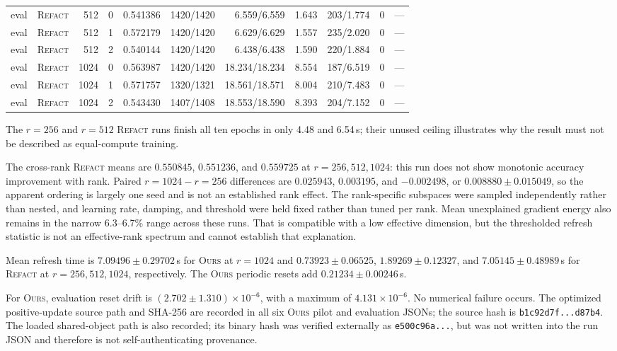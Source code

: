 \documentclass[11pt]{article}
\newcommand{\ours}{\textsc{Ours}}
\newcommand{\refact}{\textsc{Refact}}
\begin{document}
\begin{landscape}
{\begin{longtable}{@{}llrrrrrrrrr@{}}
\midrule
eval & \refact{} & 512 & 0 & 0.541386 & 1420/1420 & 6.559/6.559 &
  1.643 & 203/1.774 & 0 & --- \\
eval & \refact{} & 512 & 1 & 0.572179 & 1420/1420 & 6.629/6.629 &
  1.557 & 235/2.020 & 0 & --- \\
eval & \refact{} & 512 & 2 & 0.540144 & 1420/1420 & 6.438/6.438 &
  1.590 & 220/1.884 & 0 & --- \\
\midrule
eval & \refact{} & 1024 & 0 & 0.563987 & 1420/1420 & 18.234/18.234 &
  8.554 & 187/6.519 & 0 & --- \\
eval & \refact{} & 1024 & 1 & 0.571757 & 1320/1321 & 18.561/18.571 &
  8.004 & 210/7.483 & 0 & --- \\
eval & \refact{} & 1024 & 2 & 0.543430 & 1407/1408 & 18.553/18.590 &
  8.393 & 204/7.152 & 0 & --- \\
\bottomrule
\end{longtable}
}
\end{landscape}

The \(r=256\) and \(r=512\) \refact{} runs finish all ten epochs in only 4.48
and 6.54\,s; their unused ceiling illustrates why the result must not be
described as equal-compute training.

The cross-rank \refact{} means are \(0.550845\), \(0.551236\), and
\(0.559725\) at \(r=256,512,1024\): this run does not show monotonic accuracy
improvement with rank.  Paired \(r=1024-r=256\) differences are
\(0.025943\), \(0.003195\), and \(-0.002498\), or
\(0.008880\pm0.015049\), so the apparent ordering is largely one seed and is
not an established rank effect.  The rank-specific subspaces were sampled
independently rather than nested, and learning rate, damping, and threshold
were held fixed rather than tuned per rank.  Mean unexplained gradient energy
also remains in the narrow 6.3--6.7\% range across these runs.  That is
compatible with a low effective dimension, but the thresholded refresh
statistic is not an effective-rank spectrum and cannot establish that
explanation.

Mean refresh time is \(7.09496\pm0.29702\)\,s for \ours{} at \(r=1024\)
and \(0.73923\pm0.06525\), \(1.89269\pm0.12327\), and
\(7.05145\pm0.48989\)\,s for \refact{} at \(r=256,512,1024\),
respectively.  The \ours{} periodic resets add
\(0.21234\pm0.00246\)\,s.

For \ours{}, evaluation reset drift is
\((2.702\pm1.310)\times10^{-6}\), with a maximum of
\(4.131\times10^{-6}\).  No numerical failure occurs.  The optimized
positive-update source path and SHA-256 are recorded in all six \ours{} pilot
and evaluation JSONs; the source hash is
\texttt{b1c92d7f...d87b4}.  The loaded shared-object path is also recorded;
its binary hash was verified externally as \texttt{e500c96a...}, but was not
written into the run JSON and therefore is not self-authenticating
provenance.
\end{document}

